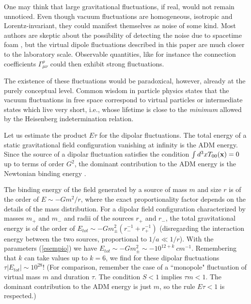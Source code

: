 \documentclass[a4paper,11pt]{article}
\begin{document}
One may think that large gravitational fluctuations, if real, 
would not remain unnoticed. Even though vacuum fluctuations
are homogeneous, isotropic and Lorentz-invariant, they
could manifest themselves as noise of some kind. 
Most authors are skeptic about the possibility
of detecting the noise due to spacetime foam \cite{ame,ell},
but the virtual dipole fluctuations described in this
paper are much closer to the laboratory scale.
Observable quantities, like for instance the 
connection coefficients $\Gamma^\rho_{\mu \nu}$
could then exhibit strong fluctuations.

The existence of these
fluctuations would be paradoxical, however, already 
at the purely conceptual level. Common wisdom in particle
physics states that the vacuum fluctuations in free space
correspond to virtual particles or intermediate states 
which live very short, i.e., whose
lifetime is close to the {\it minimum} allowed by the Heisenberg
indetermination relation. 

Let us estimate the product
$E\tau$ for the dipolar fluctuations. The total energy of
a static gravitational field configuration vanishing at
infinity is the ADM energy. Since the source of a
dipolar fluctuation satisfies the condition $\int d^3x
T_{00}({\bf x})=0$ up to terms of order $G^2$, the
dominant contribution to the ADM energy is the Newtonian
binding energy \cite{mur}.

The binding energy of the 
field generated by a source of mass $m$ and size
$r$ is of the order of $E \sim -Gm^2/r$, where
the exact proportionality factor depends on the details
of the mass distribution. 
For a dipolar field configuration characterized by
masses $m_+$ and $m_-$ 
and radii of the sources $r_+$ and $r_-$,
the total gravitational energy is of the order of
$E_{tot} \sim - G m_\pm^2 ( r_-^{-1} + r_+^{-1})$
(disregarding the interaction energy between the two
sources, proportional to $1/a \ll 1/r$).
With the parameters (\ref{esempio}) we have 
$E_{tot} \sim -G m_\pm^2 \sim
-10^{12+k} \ cm^{-1}$. Remembering that 
$k$ can take values up to $k=6$,
we find for these dipolar fluctuations $\tau |E_{tot}| \sim
10^{28}$! (For comparison, remember the case of a
``monopole" fluctuation of virtual mass $m$ and duration $\tau$. The 
condition $S<1$ implies $\tau m<1$. The dominant contribution
to the ADM energy is just $m$, so the rule $E\tau<1$ is
respected.)
\end{document}
